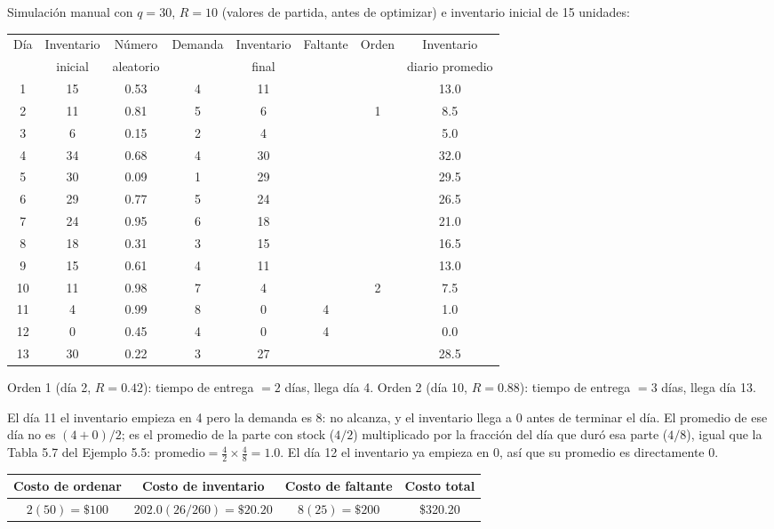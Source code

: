 \documentclass[12pt, a4paper]{article}
\begin{document}
Simulación manual con $q=30$, $R=10$ (valores de partida, antes de optimizar) e inventario inicial de 15 unidades:

\begin{center}
\small
\begin{tabular}{cccccccc}
\toprule
\multirow{2}{*}{Día} & Inventario & Número & \multirow{2}{*}{Demanda} & Inventario & \multirow{2}{*}{Faltante} & \multirow{2}{*}{Orden} & Inventario \\
 & inicial & aleatorio & & final & & & diario promedio \\
\midrule
1  & 15 & 0.53 & 4 & 11 &   &   & 13.0 \\
2  & 11 & 0.81 & 5 & 6  &   & 1 & 8.5  \\
3  & 6  & 0.15 & 2 & 4  &   &   & 5.0  \\
4  & 34 & 0.68 & 4 & 30 &   &   & 32.0 \\
5  & 30 & 0.09 & 1 & 29 &   &   & 29.5 \\
6  & 29 & 0.77 & 5 & 24 &   &   & 26.5 \\
7  & 24 & 0.95 & 6 & 18 &   &   & 21.0 \\
8  & 18 & 0.31 & 3 & 15 &   &   & 16.5 \\
9  & 15 & 0.61 & 4 & 11 &   &   & 13.0 \\
10 & 11 & 0.98 & 7 & 4  &   & 2 & 7.5  \\
11 & 4  & 0.99 & 8 & 0  & 4 &   & 1.0  \\
12 & 0  & 0.45 & 4 & 0  & 4 &   & 0.0  \\
13 & 30 & 0.22 & 3 & 27 &   &   & 28.5 \\
\bottomrule
\end{tabular}
\end{center}

Orden 1 (día 2, $R=0.42$): tiempo de entrega $=2$ días, llega día 4. Orden 2 (día 10, $R=0.88$): tiempo de entrega $=3$ días, llega día 13.

El día 11 el inventario empieza en 4 pero la demanda es 8: no alcanza, y el inventario llega a 0 antes de terminar el día. El promedio de ese día no es $(4+0)/2$; es el promedio de la parte con stock ($4/2$) multiplicado por la fracción del día que duró esa parte ($4/8$), igual que la Tabla 5.7 del Ejemplo 5.5: $\text{promedio} = \frac{4}{2}\times\frac{4}{8}=1.0$. El día 12 el inventario ya empieza en 0, así que su promedio es directamente 0.

\begin{center}
\begin{tabular}{cccc}
\toprule
Costo de ordenar & Costo de inventario & Costo de faltante & Costo total \\
\midrule
$2(50)=\$100$ & $202.0(26/260)=\$20.20$ & $8(25)=\$200$ & \$320.20 \\
\bottomrule
\end{tabular}
\end{center}
\end{document}
